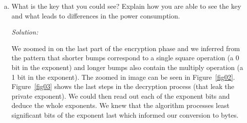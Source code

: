 \documentclass[a4paper,11pt]{article}
\newenvironment{solution}%
{\par{\noindent\small\textit{Solution:}}\vspace{-12pt}\begin{framed}}%
{\end{framed}\par}
\begin{document}
\begin{enumerate}[(a)]
\item What is the key that you could see? Explain how you are able to
see the key and what leads to differences in the power consumption.
\ifsolution\begin{solution}
  We zoomed in on the last part of the encryption phase and we inferred from the pattern that shorter bumps correspond to a single square operation (a 0 bit in the exponent) and longer bumps also contain the multiply operation (a 1 bit in the exponent). The zoomed in image can be seen in Figure~\ref{fig02}.
  Figure~\ref{fig03} shows the last steps in the decryption process (that leak the private exponent).
  We could then read out each of the exponent bits and deduce the whole exponents. We knew that the algorithm processes least significant bits of the exponent last which informed our conversion to bytes.


\end{solution}\fi

\end{enumerate}
\end{document}
